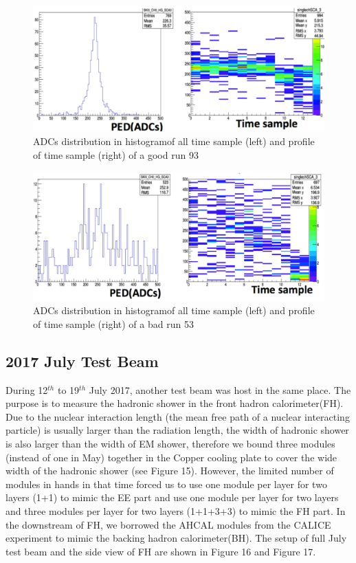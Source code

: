 \documentclass{article}
\begin{document}
\begin{figure}
\centering
\includegraphics[width=.7\textwidth]{figures/goodPEDrun.pdf}
\caption{ADCs distribution in histogramof all time sample (left) and profile of time sample (right) of a good run 93  }
\label{pics:blablabla}
\end{figure}


\begin{figure}
\centering
\includegraphics[width=.7\textwidth]{figures/badPEDrun.pdf}
\caption{ADCs distribution in histogramof all time sample (left) and profile of time sample (right) of a bad run 53 }
\label{pics:blablabla}
\end{figure}



\subsection{2017 July Test Beam}

During 12$^{th}$ to 19$^{th}$ July 2017, another test beam was host in the same place. The purpose is to measure the hadronic shower in the front hadron calorimeter(FH). Due to the nuclear interaction length (the mean free path of a nuclear interacting particle) is usually larger than the radiation length, the width of hadronic shower is also larger than the width of EM shower, therefore we bound three modules (instead of one in May) together in the Copper cooling plate to cover the wide width of the hadronic shower (see Figure 15). However, the limited number of modules in hands in that time forced us to use one module per layer for two layers (1+1) to mimic the EE part and use one module per layer for two layers and three modules per layer for two layers (1+1+3+3) to mimic the FH part. In the downstream of FH, we borrowed the AHCAL modules from the CALICE experiment \cite{CALICE ref} to mimic the backing hadron calorimeter(BH). The setup of full July test beam and the side view of FH are shown in Figure 16 and Figure 17. 
\end{document}
